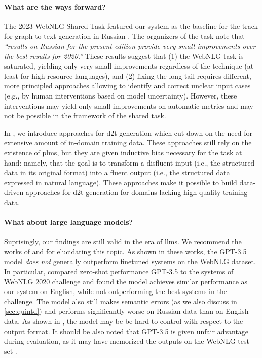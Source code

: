 \paragraph{What are the ways forward?} The 2023 WebNLG Shared Task featured our system as the baseline for the track for graph-to-text generation in Russian \cite{cripwell2023WebNLGShared2023}. The organizers of the task note that \textit{``results on Russian for the present edition provide very small improvements over the best results for 2020.''} These results suggest that (1) the WebNLG task is saturated, yielding only very small improvements regardless of the technique (at least for high-resource languages), and (2) fixing the long tail requires different, more principled approaches allowing to identify and correct unclear input cases (e.g., by human interventions based on model uncertainty). However, these interventions may yield only small improvements on automatic metrics and may not be possible in the framework of the shared task.


In , we introduce approaches for \ac{d2t} generation which cut down on the need for extensive amount of in-domain training data. These approaches still rely on the existence of \acp{plm}, but they are given inductive bias necessary for the task at hand: namely, that the goal is to transform a disfluent input (i.e., the structured data in its original format) into a fluent output (i.e., the structured data expressed in natural language). These approaches make it possible to build data-driven approaches for \ac{d2t} generation for domains lacking high-quality training data.



\paragraph{What about large language models?} Suprisingly, our findings are still valid in the era of \acp{llm}. We recommend the works of \citet{axelssonUsingLargeLanguage2023} and \citet{yuanEvaluatingGenerativeModels2023} for elucidating this topic. As shown in these works, the GPT-3.5 model \cite{chatgpt} \emph{does not} generally outperform finetuned systems on the WebNLG dataset. In particular, \citet{axelssonUsingLargeLanguage2023} compared zero-shot performance GPT-3.5 to the systems of WebNLG 2020 challenge and found the model achieves similar performance as our system on English, while not outperforming the best systems in the challenge. The model also still makes semantic errors (as we also discuss in \autoref{sec:quintd}) and performs significantly worse on Russian data than on English data. As shown in \citet{yuanEvaluatingGenerativeModels2023}, the model may be be hard to control with respect to the output format. It should be also noted that GPT-3.5 is given unfair advantage during evaluation, as it may have memorized the outputs on the WebNLG test set \cite{balloccu2024leak}.



